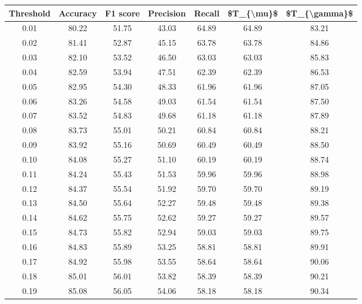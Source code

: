 \begin{tabular}{|c|c|c|c|c|c|c|}
\hline
 Threshold &  Accuracy &  F1 score &  Precision &  Recall &  \$T\_\{\textbackslash mu\}\$ &  \$T\_\{\textbackslash gamma\}\$ \\
\hline
      0.01 &     80.22 &     51.75 &      43.03 &   64.89 &      64.89 &         83.21 \\
      0.02 &     81.41 &     52.87 &      45.15 &   63.78 &      63.78 &         84.86 \\
      0.03 &     82.10 &     53.52 &      46.50 &   63.03 &      63.03 &         85.83 \\
      0.04 &     82.59 &     53.94 &      47.51 &   62.39 &      62.39 &         86.53 \\
      0.05 &     82.95 &     54.30 &      48.33 &   61.96 &      61.96 &         87.05 \\
      0.06 &     83.26 &     54.58 &      49.03 &   61.54 &      61.54 &         87.50 \\
      0.07 &     83.52 &     54.83 &      49.68 &   61.18 &      61.18 &         87.89 \\
      0.08 &     83.73 &     55.01 &      50.21 &   60.84 &      60.84 &         88.21 \\
      0.09 &     83.92 &     55.16 &      50.69 &   60.49 &      60.49 &         88.50 \\
      0.10 &     84.08 &     55.27 &      51.10 &   60.19 &      60.19 &         88.74 \\
      0.11 &     84.24 &     55.43 &      51.53 &   59.96 &      59.96 &         88.98 \\
      0.12 &     84.37 &     55.54 &      51.92 &   59.70 &      59.70 &         89.19 \\
      0.13 &     84.50 &     55.64 &      52.27 &   59.48 &      59.48 &         89.38 \\
      0.14 &     84.62 &     55.75 &      52.62 &   59.27 &      59.27 &         89.57 \\
      0.15 &     84.73 &     55.82 &      52.94 &   59.03 &      59.03 &         89.75 \\
      0.16 &     84.83 &     55.89 &      53.25 &   58.81 &      58.81 &         89.91 \\
      0.17 &     84.92 &     55.98 &      53.55 &   58.64 &      58.64 &         90.06 \\
      0.18 &     85.01 &     56.01 &      53.82 &   58.39 &      58.39 &         90.21 \\
      0.19 &     85.08 &     56.05 &      54.06 &   58.18 &      58.18 &         90.34 \\

\end{tabular}
